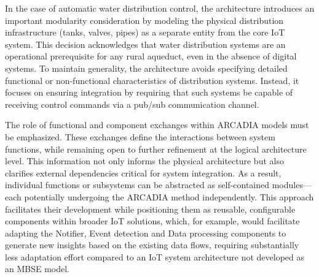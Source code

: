 \documentclass[conference]{IEEEtran}
\begin{document}
In the case of automatic water distribution control, the architecture introduces an important modularity consideration by modeling the physical distribution infrastructure (tanks, valves, pipes) as a separate entity from the core IoT system. This decision acknowledges that water distribution systems are an operational prerequisite for any rural aqueduct, even in the absence of digital systems. To maintain generality, the architecture avoids specifying detailed functional or non-functional characteristics of distribution systems. Instead, it focuses on ensuring integration by requiring that such systems be capable of receiving control commands via a pub/sub communication channel.

The role of functional and component exchanges within ARCADIA models must be emphasized. These exchanges define the interactions between system functions, while remaining open to further refinement at the logical architecture level.
This information not only informs the physical architecture but also clarifies external dependencies critical for system integration. As a result, individual functions or subsystems can be abstracted as self-contained modules—each potentially undergoing the ARCADIA method independently. This approach facilitates their development while positioning them as reusable, configurable components within broader IoT solutions, which, for example, would facilitate
adapting the Notifier, Event detection and Data processing components to generate new insights
based on the existing data flows, requiring substantially less adaptation effort compared
to an IoT system architecture not developed as an MBSE model.
\end{document}
